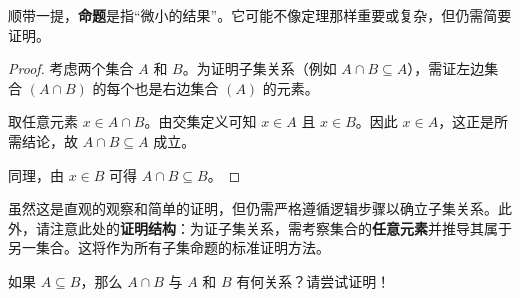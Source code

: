 顺带一提，\textbf{命题}是指``微小的结果''。它可能不像定理那样重要或复杂，但仍需简要证明。

\begin{proof}
    考虑两个集合 $A$ 和 $B$。为证明子集关系（例如 $A \cap B \subseteq A$），需证左边集合 $(A \cap B)$ 的每个也是右边集合 $(A)$ 的元素。

    取任意元素 $x \in A \cap B$。由交集定义可知 $x \in A$ 且 $x \in B$。因此 $x \in A$，这正是所需结论，故 $A \cap B \subseteq A$ 成立。

    同理，由 $x \in B$ 可得 $A \cap B \subseteq B$。
\end{proof}

虽然这是直观的观察和简单的证明，但仍需严格遵循逻辑步骤以确立子集关系。此外，请注意此处的\textbf{证明结构}：为证子集关系，需考察集合的\textbf{任意元素}并推导其属于另一集合。这将作为所有子集命题的标准证明方法。

如果 $A \subseteq B$，那么 $A \cap B$ 与 $A$ 和 $B$ 有何关系？请尝试证明！
